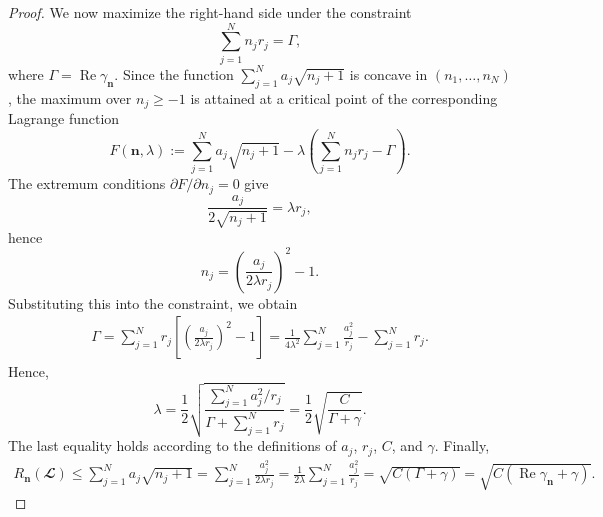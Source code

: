 \documentclass{SciPost}
\renewcommand{\Re}{\operatorname{Re}}
\begin{document}
\begin{proof}
    We now maximize the right-hand side under the constraint
    \begin{equation}
        \sum\limits_{j=1}^N n_j r_j = \Gamma,
    \end{equation}
    where \(\Gamma = \Re \gamma_{\bm n}\). Since the function
    \(
        \sum_{j=1}^N a_j \sqrt{n_j+1}
    \)
    is concave in \((n_1,\dots,n_N)\), the maximum over \(n_j \geqslant -1\) is attained at a critical point of the corresponding Lagrange function
    \begin{equation}
        F(\bm n,\lambda)
        :=
        \sum\limits_{j=1}^N a_j \sqrt{n_j + 1}
        -
        \lambda
        \left(
            \sum\limits_{j=1}^N n_j r_j - \Gamma
        \right).
    \end{equation}
    The extremum conditions \(\partial F/\partial n_j = 0\) give
    \begin{equation}
        \frac{a_j}{2\sqrt{n_j+1}} = \lambda r_j,
    \end{equation}
    hence
    \begin{equation}
        n_j
        =
        \left(
            \frac{a_j}{2\lambda r_j}
        \right)^2 - 1.
    \end{equation}
    Substituting this into the constraint, we obtain
    \begin{equation}
        \begin{aligned}
            \Gamma
            =
            \sum\limits_{j=1}^N r_j
            \left[
                \left(
                    \frac{a_j}{2\lambda r_j}
                \right)^2 - 1
            \right]
            =
            \frac{1}{4\lambda^2}
            \sum\limits_{j=1}^N \frac{a_j^2}{r_j}
            -
            \sum\limits_{j=1}^N r_j.
        \end{aligned}
    \end{equation}
    Hence,
    \begin{equation}
        \lambda
        =
        \frac{1}{2}
        \sqrt{
            \frac{
                \sum\limits_{j=1}^N a_j^2/r_j
            }{
                \Gamma + \sum\limits_{j=1}^N r_j
            }
        }=
        \frac{1}{2}
        \sqrt{
            \frac{C}{\Gamma + \gamma}
        }.
    \end{equation}
    The last equality holds according to the definitions of \(a_j\), \(r_j\), \(C\), and \(\gamma\).
    Finally,
    \begin{equation}
        \begin{aligned}
            R_{\bm n}(\mathbfcal L)
            \leqslant
            \sum\limits_{j=1}^N a_j \sqrt{n_j+1}
            =
            \sum\limits_{j=1}^N
            \frac{a_j^2}{2\lambda r_j}
            =
            \frac{1}{2\lambda}
            \sum\limits_{j=1}^N \frac{a_j^2}{r_j}
            =
            \sqrt{
                C(\Gamma+\gamma)
            }=
            \sqrt{
                C(\Re \gamma_{\bm n} + \gamma)
            }.
        \end{aligned}
    \end{equation}
\end{proof}
\end{document}
